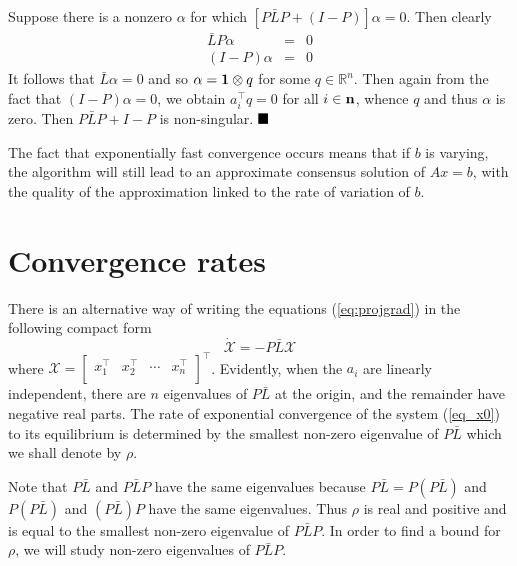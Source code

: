 \documentclass{aims}
\def\n{{\bf n}}
\def\qed{ \rule{.1in}{.1in}}
\begin{document}
Suppose there is a nonzero $\alpha$ for which $[P\bar LP+(I-P)]\alpha=0$. Then clearly
\begin{eqnarray}
\bar LP\alpha&=&0\\
(I-P)\alpha&=&0
\end{eqnarray}
It follows that $\bar L\alpha=0$ and so $\alpha={\bf{1}}\otimes q$ for some $q\in \mathbb R^n$. Then again from the fact that $(I-P)\alpha=0$, we obtain $a_i^{\top}q=0$ for all $i\in \n$, whence $q$ and thus $\alpha$ is zero. Then $P\bar{L}P+I-P$ is non-singular. $\qed$
\bigskip


The fact that exponentially fast convergence occurs means that if $b$ is varying, the algorithm will still lead to an approximate consensus solution of $Ax=b$, with the quality of the approximation linked to the rate of variation of $b$.



\section{Convergence rates}
There is an alternative way of writing the equations (\ref{eq:projgrad}) in the following compact form
\begin{equation}\label{eq_x0}
\dot{\mathcal X}=-P\bar L\mathcal X
\end{equation} where $\mathcal{X}=\left[
                                   \begin{array}{cccc}
                                     x_1^{\top} & x_2^{\top} & \cdots & x_n^{\top} \\
                                   \end{array}
                                 \right]^{\top}
$.
Evidently, when the $a_i$ are linearly independent, there are $n$ eigenvalues of $P \bar L$ at the origin, and the remainder have negative real parts. The rate of exponential convergence of the system (\ref{eq_x0}) to its equilibrium is determined by the smallest non-zero eigenvalue of $P\bar{L}$ which we shall denote by $\rho$.

Note that $P\bar{L}$ and $P\bar{L}P$ have the same eigenvalues because $P\bar{L}=P(P\bar{L})$ and $P(P\bar L)$ and $(P\bar L)P$ have the same eigenvalues. Thus $\rho$ is real and positive and is equal to the smallest non-zero eigenvalue of $P\bar{L}P$. In order to find a bound for $\rho$, we will study non-zero eigenvalues of $P\bar{L}P$.
\end{document}
